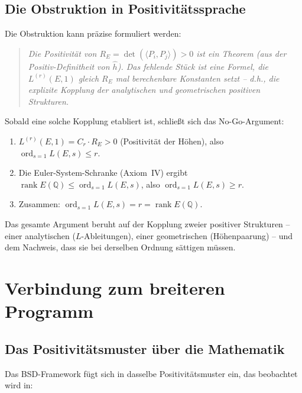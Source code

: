 \documentclass[aps,prd,twocolumn,superscriptaddress,nofootinbib,floatfix]{revtex4-2}
\theoremstyle{definition}
\theoremstyle{remark}
\DeclareMathOperator{\ord}{ord}
\DeclareMathOperator{\rank}{rank}
\begin{document}
\subsection{Die Obstruktion in Positivitätssprache}

Die Obstruktion kann präzise formuliert werden:

\begin{quote}
\textit{Die Positivität von $R_E = \det(\langle P_i, P_j \rangle) > 0$ ist ein Theorem (aus der Positiv-Definitheit von $\hat{h}$). Das fehlende Stück ist eine Formel, die $L^{(r)}(E,1)$ gleich $R_E$ mal berechenbare Konstanten setzt -- d.h., die explizite Kopplung der analytischen und geometrischen positiven Strukturen.}
\end{quote}

Sobald eine solche Kopplung etabliert ist, schließt sich das No-Go-Argument:
\begin{enumerate}
\item $L^{(r)}(E,1) = C_r \cdot R_E > 0$ (Positivität der Höhen), also $\ord_{s=1} L(E,s) \leq r$.
\item Die Euler-System-Schranke (Axiom~IV) ergibt $\rank E(\mathbb{Q}) \leq \ord_{s=1} L(E,s)$, also $\ord_{s=1} L(E,s) \geq r$.
\item Zusammen: $\ord_{s=1} L(E,s) = r = \rank E(\mathbb{Q})$.
\end{enumerate}

Das gesamte Argument beruht auf der Kopplung zweier positiver Strukturen -- einer analytischen ($L$-Ableitungen), einer geometrischen (Höhenpaarung) -- und dem Nachweis, dass sie bei derselben Ordnung \glqq sättigen\grqq{} müssen.


\clearpage
\section{Verbindung zum breiteren Programm}
\label{sec:connection}

\subsection{Das Positivitätsmuster über die Mathematik}

Das BSD-Framework fügt sich in dasselbe Positivitätsmuster ein, das beobachtet wird in:
\end{document}
